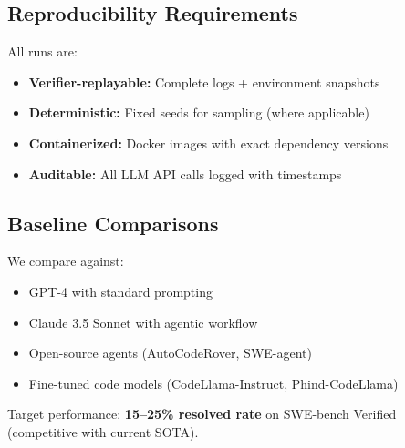 \subsection{Reproducibility Requirements}
All runs are:
\begin{itemize}[leftmargin=1.1em]
  \item \textbf{Verifier-replayable:} Complete logs + environment snapshots
  \item \textbf{Deterministic:} Fixed seeds for sampling (where applicable)
  \item \textbf{Containerized:} Docker images with exact dependency versions
  \item \textbf{Auditable:} All LLM API calls logged with timestamps
\end{itemize}

\subsection{Baseline Comparisons}
We compare against:
\begin{itemize}[leftmargin=1.1em]
  \item GPT-4 with standard prompting
  \item Claude 3.5 Sonnet with agentic workflow
  \item Open-source agents (AutoCodeRover, SWE-agent)
  \item Fine-tuned code models (CodeLlama-Instruct, Phind-CodeLlama)
\end{itemize}

Target performance: \textbf{15--25\% resolved rate} on SWE-bench Verified (competitive with current SOTA).
